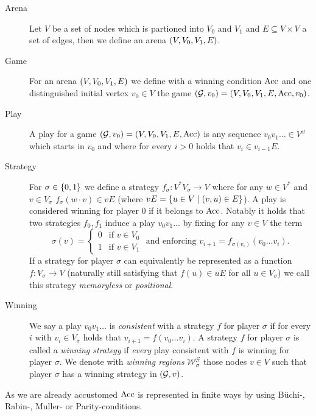\begin{definition}
  \begin{description}
    \item [Arena] Let $V$ be a set of nodes which is partioned into $V_{0}$ and
      $V_{1}$ and $E\subseteq V\times V$ a set of edges, then we define an
      arena $\left(V, V_{0}, V_{1}, E\right)$.
    \item [Game] For an arena $\left(V, V_{0}, V_{1}, E\right)$ we define with a
      winning condition $\operatorname{Acc}$ and one distinguished initial vertex
      $v_{0}\in V$ the game
      $\left(\mathcal{G}, v_{0}\right) = \left(V, V_{0}, V_{1}, E, \operatorname{Acc}, v_{0}\right)$.
    \item [Play] A play for a game $\left(\mathcal{G}, v_{0}\right) = \left(V,
      V_{0}, V_{1}, E, \operatorname{Acc}\right)$ is any sequence $v_{0}v_{1}\dots\in
      V^{\omega}$ which starts in $v_{0}$ and where for every $i > 0$ holds
      that $v_{i}\in v_{i-1}E$.
    \item [Strategy] For $\sigma\in\left\{0,1\right\}$ we define a strategy
      $f_{\sigma}: V^{*}V_{\sigma}\rightarrow V$ where for any $w\in V^{*}$ and
      $v\in V_{\sigma}$ $f_{\sigma}(w\cdot v)\in vE$ (where $vE =
      \left\{u\in V\mid\left(v,u\right)\in E\right\}$). A play is considered winning for
      player $0$ if it belongs to $\operatorname{Acc}$. Notably it holds that two strategies
      $f_{0}, f_{1}$ induce a play $v_{0}v_{1}\dots$ by fixing for any $v\in V$
      the term
      \begin{equation*}
        \sigma(v) = \begin{cases}
          0&\text{if }v\in V_{0}\\
          1&\text{if }v\in V_{1}
        \end{cases}\text{ and enforcing }
        v_{i+1} = f_{\sigma(v_{i})}(v_{0}\dots v_{i}).
      \end{equation*}
      If a strategy for player $\sigma$ can equivalently be represented as a
      function $f:V_{\sigma}\rightarrow V$ (naturally still satisfying that
      $f(u)\in uE$ for all $u\in V_{\sigma}$) we call this strategy
      \emph{memoryless} or \emph{positional}.
    \item [Winning] We say a play $v_{0}v_{1}\dots$ is \emph{consistent} with a
      strategy $f$ for player $\sigma$ if for every $i$ with
      $v_{i}\in V_{\sigma}$ holds that $v_{i+1} = f(v_{0}\dots v_{i})$. 
      A strategy $f$ for player $\sigma$ is called a \emph{winning strategy} if
      \emph{every} play consistent with $f$ is winning for player $\sigma$.
      We denote with \emph{winning regions}
      $\mathcal{W}^{\mathcal{G}}_{\sigma}$ those nodes $v\in V$ such that
      player $\sigma$ has a winning strategy in $\left(\mathcal{G}, v\right)$.
  \end{description}
  As we are already accustomed $\operatorname{Acc}$ is represented in finite ways by using
  Büchi-, Rabin-, Muller- or Parity-conditions.
\end{definition}
